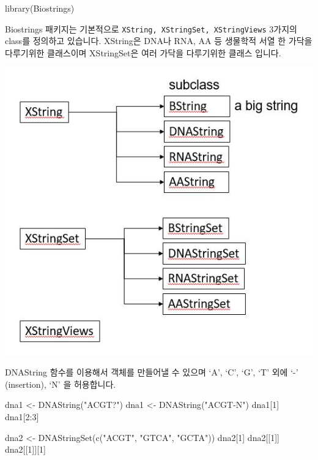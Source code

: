 \documentclass[
]{book}
\newenvironment{Shaded}{\begin{snugshade}}{\end{snugshade}}
\newcommand{\DecValTok}[1]{\textcolor[rgb]{0.00,0.00,0.81}{#1}}
\newcommand{\FunctionTok}[1]{\textcolor[rgb]{0.00,0.00,0.00}{#1}}
\newcommand{\NormalTok}[1]{#1}
\newcommand{\OtherTok}[1]{\textcolor[rgb]{0.56,0.35,0.01}{#1}}
\newcommand{\SpecialCharTok}[1]{\textcolor[rgb]{0.00,0.00,0.00}{#1}}
\newcommand{\StringTok}[1]{\textcolor[rgb]{0.31,0.60,0.02}{#1}}
\begin{document}
\begin{Shaded}
\begin{Highlighting}[]
\FunctionTok{library}\NormalTok{(Biostrings)}
\end{Highlighting}
\end{Shaded}

Biostrings 패키지는 기본적으로 \texttt{XString,\ XStringSet,\ XStringViews} 3가지의 class를 정의하고 있습니다. XString은 DNA나 RNA, AA 등 생물학적 서열 한 가닥을 다루기위한 클래스이며 XStringSet은 여러 가닥을 다루기위한 클래스 입니다.

\includegraphics{images/04/biostrings.JPG}

DNAString 함수를 이용해서 객체를 만들어낼 수 있으며 `A', `C', `G', `T' 외에 `-' (insertion), `N' 을 허용합니다.

\begin{Shaded}
\begin{Highlighting}[]
\NormalTok{dna1 }\OtherTok{\textless{}{-}} \FunctionTok{DNAString}\NormalTok{(}\StringTok{"ACGT?"}\NormalTok{)}
\NormalTok{dna1 }\OtherTok{\textless{}{-}} \FunctionTok{DNAString}\NormalTok{(}\StringTok{"ACGT{-}N"}\NormalTok{)}
\NormalTok{dna1[}\DecValTok{1}\NormalTok{]}
\NormalTok{dna1[}\DecValTok{2}\SpecialCharTok{:}\DecValTok{3}\NormalTok{]}

\NormalTok{dna2 }\OtherTok{\textless{}{-}} \FunctionTok{DNAStringSet}\NormalTok{(}\FunctionTok{c}\NormalTok{(}\StringTok{"ACGT"}\NormalTok{, }\StringTok{"GTCA"}\NormalTok{, }\StringTok{"GCTA"}\NormalTok{))}
\NormalTok{dna2[}\DecValTok{1}\NormalTok{]}
\NormalTok{dna2[[}\DecValTok{1}\NormalTok{]]}
\NormalTok{dna2[[}\DecValTok{1}\NormalTok{]][}\DecValTok{1}\NormalTok{]}
\end{Highlighting}
\end{Shaded}
\end{document}
